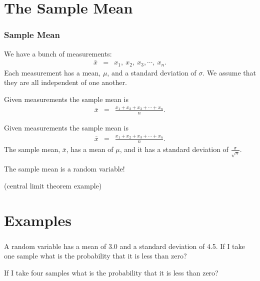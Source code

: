 \section{The Sample Mean}

\begin{frame}
  \frametitle{Sample Mean}

  We have a bunch of measurements:
  \begin{eqnarray*}
    \bar{x} & = & x_1,~x_2,~x_3,\cdots,~x_n.
  \end{eqnarray*}
  Each measurement has a mean, $\mu$, and a standard deviation of
  $\sigma$. We assume that they are all independent of one another.
  
  {
    \begin{definition}
      Given measurements the sample mean is 
      \begin{eqnarray*}
        \bar{x} & = & \frac{x_1+x_2+x_3+\cdots+x_n}{n}.
      \end{eqnarray*}
    \end{definition}
  }

  {
    \begin{definition}
      Given measurements the sample mean is 
      \begin{eqnarray*}
        \bar{x} & = & \frac{x_1+x_2+x_3+\cdots+x_n}{n}.
      \end{eqnarray*}
      The sample mean, $\bar{x}$,  has a mean of $\mu$, and it has a
      standard deviation of $\frac{\sigma}{\sqrt{n}}$.
    \end{definition}
  }


  {
    The sample mean is a random variable!
  }

\end{frame}


\begin{frame}
  (central limit theorem example)
\end{frame}

\section{Examples}

\begin{frame}
  \frametitle{}

  A random variable has a mean of 3.0 and a standard deviation of
  4.5. If I take one sample what is the probability that it is less
  than zero?

  \vfill

  {
    If I take four samples what is the probability that it is less
    than zero?
  }

  \vfill

\end{frame}


